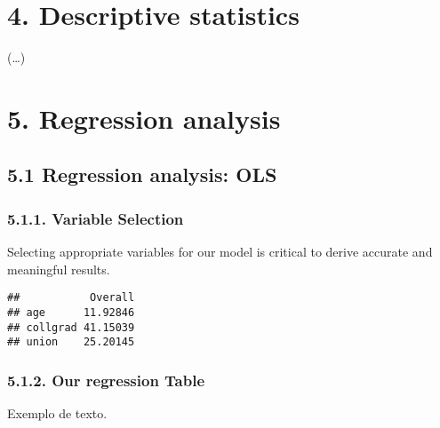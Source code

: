 \documentclass[
]{article}
\begin{document}
\hypertarget{descriptive-statistics}{%
\section{4. Descriptive statistics}\label{descriptive-statistics}}

(\ldots)

\hypertarget{regression-analysis}{%
\section{5. Regression analysis}\label{regression-analysis}}

\hypertarget{regression-analysis-ols}{%
\subsection{5.1 Regression analysis:
OLS}\label{regression-analysis-ols}}

\hypertarget{variable-selection}{%
\subsubsection{5.1.1. Variable Selection}\label{variable-selection}}

Selecting appropriate variables for our model is critical to derive
accurate and meaningful results.

\begin{verbatim}
##           Overall
## age      11.92846
## collgrad 41.15039
## union    25.20145
\end{verbatim}

\hypertarget{our-regression-table}{%
\subsubsection{5.1.2. Our regression Table}\label{our-regression-table}}

Exemplo de texto.
\end{document}
